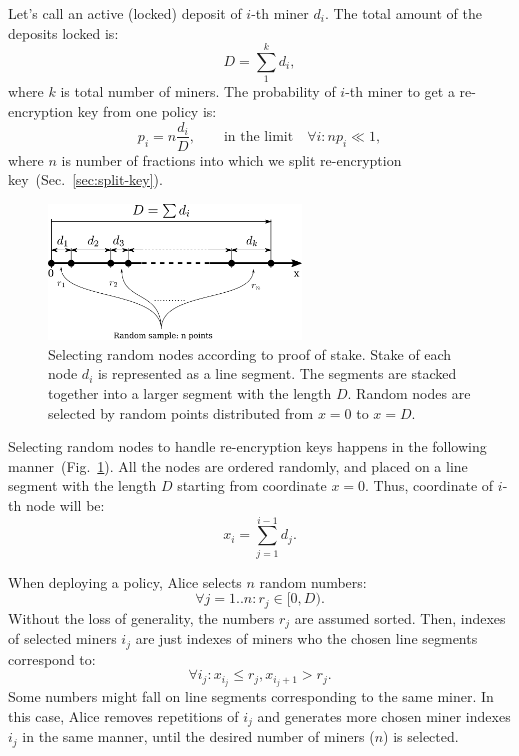 \documentclass[longbibliography,nofootinbib]{revtex4-1}
\newcommand{\figref}[1]{Fig.~\ref{#1}}
\begin{document}
Let's call an active (locked) deposit of $i$-th miner $d_i$.
The total amount of the deposits locked is:
\begin{equation}
    D = \sum_1^k d_i,
\end{equation}
where $k$ is total number of miners.
The probability of $i$-th miner to get a re-encryption key from one policy is:
\begin{equation}
    p_i = n\frac{d_i}{D},\qquad\text{in the limit}\quad \forall i: n p_i \ll 1,
\end{equation}
where $n$ is number of fractions into which we split re-encryption key~(Sec.~\ref{sec:split-key}).

\begin{figure}
    \centering
    \includegraphics[width=0.6\textwidth]{pdf/miners-ruler.pdf}
    \caption{Selecting random nodes according to proof of stake.
             Stake of each node $d_i$ is represented as a line segment.
             The segments are stacked together into a larger segment with the length $D$.
             Random nodes are selected by random points distributed from $x=0$ to $x=D$.}
    \label{fig:random-nodes}
\end{figure}

Selecting random nodes to handle re-encryption keys happens in the following manner~(\figref{fig:random-nodes}).
All the nodes are ordered randomly, and placed on a line segment with the length $D$ starting from coordinate $x=0$.
Thus, coordinate of $i$-th node will be:
\begin{equation}
    x_i = \sum_{j=1}^{i-1} d_j.
\end{equation}

When deploying a policy, Alice selects $n$ random numbers:
\begin{equation}
    \forall j=1..n: r_j \in [0, D).
\end{equation}
Without the loss of generality, the numbers $r_j$ are assumed sorted.
Then, indexes of selected miners $i_j$ are just indexes of miners who the chosen line segments correspond to:
\begin{equation}
    \forall i_j: x_{i_j} \le r_j, x_{i_j + 1} > r_j.
\end{equation}
Some numbers might fall on line segments corresponding to the same miner.
In this case, Alice removes repetitions of $i_j$ and generates more chosen miner indexes $i_j$ in the same manner, until the desired number of miners ($n$) is
selected.
\end{document}

